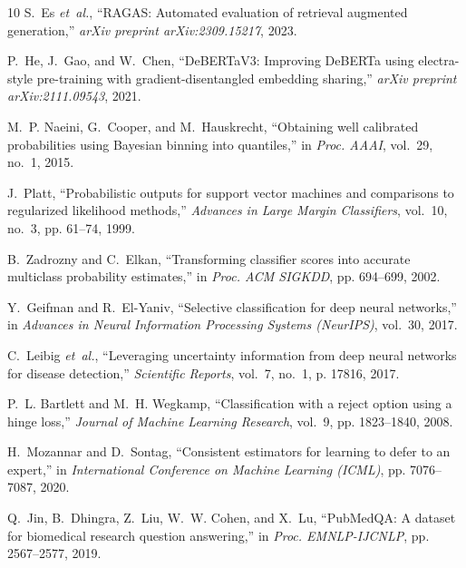 \documentclass[journal,10pt]{IEEEtran}
\begin{document}
\begin{thebibliography}{10}
S.~Es \emph{et~al.}, ``RAGAS: Automated evaluation of retrieval augmented generation,'' \emph{arXiv preprint arXiv:2309.15217}, 2023.

P.~He, J.~Gao, and W.~Chen, ``DeBERTaV3: Improving DeBERTa using electra-style pre-training with gradient-disentangled embedding sharing,'' \emph{arXiv preprint arXiv:2111.09543}, 2021.

M.~P. Naeini, G.~Cooper, and M.~Hauskrecht, ``Obtaining well calibrated probabilities using Bayesian binning into quantiles,'' in \emph{Proc. AAAI}, vol.~29, no.~1, 2015.

J.~Platt, ``Probabilistic outputs for support vector machines and comparisons to regularized likelihood methods,'' \emph{Advances in Large Margin Classifiers}, vol.~10, no.~3, pp. 61--74, 1999.

B.~Zadrozny and C.~Elkan, ``Transforming classifier scores into accurate multiclass probability estimates,'' in \emph{Proc. ACM SIGKDD}, pp. 694--699, 2002.

Y.~Geifman and R.~El-Yaniv, ``Selective classification for deep neural networks,'' in \emph{Advances in Neural Information Processing Systems (NeurIPS)}, vol.~30, 2017.

C.~Leibig \emph{et~al.}, ``Leveraging uncertainty information from deep neural networks for disease detection,'' \emph{Scientific Reports}, vol.~7, no.~1, p. 17816, 2017.

P.~L. Bartlett and M.~H. Wegkamp, ``Classification with a reject option using a hinge loss,'' \emph{Journal of Machine Learning Research}, vol.~9, pp. 1823--1840, 2008.

H.~Mozannar and D.~Sontag, ``Consistent estimators for learning to defer to an expert,'' in \emph{International Conference on Machine Learning (ICML)}, pp. 7076--7087, 2020.

Q.~Jin, B.~Dhingra, Z.~Liu, W.~W. Cohen, and X.~Lu, ``PubMedQA: A dataset for biomedical research question answering,'' in \emph{Proc. EMNLP-IJCNLP}, pp. 2567--2577, 2019.

\end{thebibliography}
\end{document}
